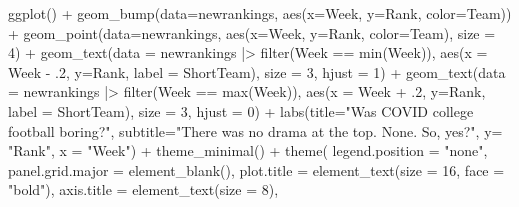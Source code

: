 \documentclass[
  letterpaper,
  DIV=11,
  numbers=noendperiod]{scrreprt}
\newenvironment{Shaded}{\begin{snugshade}}{\end{snugshade}}
\newcommand{\AttributeTok}[1]{\textcolor[rgb]{0.40,0.45,0.13}{#1}}
\newcommand{\DecValTok}[1]{\textcolor[rgb]{0.68,0.00,0.00}{#1}}
\newcommand{\FunctionTok}[1]{\textcolor[rgb]{0.28,0.35,0.67}{#1}}
\newcommand{\NormalTok}[1]{\textcolor[rgb]{0.00,0.23,0.31}{#1}}
\newcommand{\SpecialCharTok}[1]{\textcolor[rgb]{0.37,0.37,0.37}{#1}}
\newcommand{\StringTok}[1]{\textcolor[rgb]{0.13,0.47,0.30}{#1}}
\begin{document}
\begin{Shaded}
\begin{Highlighting}[]
\FunctionTok{ggplot}\NormalTok{() }\SpecialCharTok{+} 
  \FunctionTok{geom\_bump}\NormalTok{(}\AttributeTok{data=}\NormalTok{newrankings, }\FunctionTok{aes}\NormalTok{(}\AttributeTok{x=}\NormalTok{Week, }\AttributeTok{y=}\NormalTok{Rank, }\AttributeTok{color=}\NormalTok{Team)) }\SpecialCharTok{+} 
  \FunctionTok{geom\_point}\NormalTok{(}\AttributeTok{data=}\NormalTok{newrankings, }\FunctionTok{aes}\NormalTok{(}\AttributeTok{x=}\NormalTok{Week, }\AttributeTok{y=}\NormalTok{Rank, }\AttributeTok{color=}\NormalTok{Team), }\AttributeTok{size =} \DecValTok{4}\NormalTok{) }\SpecialCharTok{+}   
  \FunctionTok{geom\_text}\NormalTok{(}\AttributeTok{data =}\NormalTok{ newrankings }\SpecialCharTok{|\textgreater{}} \FunctionTok{filter}\NormalTok{(Week }\SpecialCharTok{==} \FunctionTok{min}\NormalTok{(Week)), }\FunctionTok{aes}\NormalTok{(}\AttributeTok{x =}\NormalTok{ Week }\SpecialCharTok{{-}}\NormalTok{ .}\DecValTok{2}\NormalTok{, }\AttributeTok{y=}\NormalTok{Rank, }\AttributeTok{label =}\NormalTok{ ShortTeam), }\AttributeTok{size =} \DecValTok{3}\NormalTok{, }\AttributeTok{hjust =} \DecValTok{1}\NormalTok{) }\SpecialCharTok{+}
  \FunctionTok{geom\_text}\NormalTok{(}\AttributeTok{data =}\NormalTok{ newrankings }\SpecialCharTok{|\textgreater{}} \FunctionTok{filter}\NormalTok{(Week }\SpecialCharTok{==} \FunctionTok{max}\NormalTok{(Week)), }\FunctionTok{aes}\NormalTok{(}\AttributeTok{x =}\NormalTok{ Week }\SpecialCharTok{+}\NormalTok{ .}\DecValTok{2}\NormalTok{, }\AttributeTok{y=}\NormalTok{Rank, }\AttributeTok{label =}\NormalTok{ ShortTeam), }\AttributeTok{size =} \DecValTok{3}\NormalTok{, }\AttributeTok{hjust =} \DecValTok{0}\NormalTok{) }\SpecialCharTok{+}
  \FunctionTok{labs}\NormalTok{(}\AttributeTok{title=}\StringTok{"Was COVID college football boring?"}\NormalTok{, }\AttributeTok{subtitle=}\StringTok{"There was no drama at the top. None. So, yes?"}\NormalTok{, }\AttributeTok{y=} \StringTok{"Rank"}\NormalTok{, }\AttributeTok{x =} \StringTok{"Week"}\NormalTok{) }\SpecialCharTok{+}
  \FunctionTok{theme\_minimal}\NormalTok{() }\SpecialCharTok{+}
  \FunctionTok{theme}\NormalTok{(}
    \AttributeTok{legend.position =} \StringTok{"none"}\NormalTok{,}
    \AttributeTok{panel.grid.major =} \FunctionTok{element\_blank}\NormalTok{(),}
    \AttributeTok{plot.title =} \FunctionTok{element\_text}\NormalTok{(}\AttributeTok{size =} \DecValTok{16}\NormalTok{, }\AttributeTok{face =} \StringTok{"bold"}\NormalTok{),}
    \AttributeTok{axis.title =} \FunctionTok{element\_text}\NormalTok{(}\AttributeTok{size =} \DecValTok{8}\NormalTok{), }

\end{Highlighting}
\end{Shaded}
\end{document}
